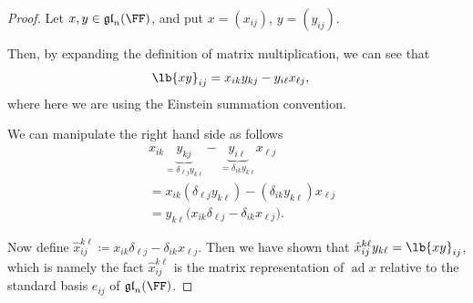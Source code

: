\documentclass{article}
\DeclarePairedDelimiter\lb\lbrack\rbrack
\DeclareMathOperator{\ad}{ad}
\newcommand*\gl{\ensuremath{\mathfrak{gl}}}
\begin{document}
\begin{proof}
    Let $x, y \in \gl_n(\FF)$, and put $x = (x_{ij})$, $y = (y_{ij})$.

    Then, by expanding the definition of matrix multiplication, we can see that
    \begin{align*}
        \lb{xy}_{ij}
        &=
        x_{ik}
        y_{kj}
        -
        y_{i\ell}x_{\ell j},
    \end{align*}
    where here we are using the Einstein summation convention.

    We can manipulate the right hand side as follows
    \begin{align*}
        &
        x_{ik}
        \underbrace{y_{kj}}_{=\delta_{\ell j}y_{k\ell}}
        -
        \underbrace{y_{i\ell}}_{=\delta_{ik}y_{k\ell}}
        x_{\ell j}
        \\
        &=
        x_{ik}
        (\delta_{\ell j}y_{k\ell})
        -
        (\delta_{ik}y_{k\ell})
        x_{\ell j}
        \\
        &=
        y_{k\ell}
        \Big(
            x_{ik}\delta_{\ell j}
            -
            \delta_{ik}x_{\ell j}
        \Big).
    \end{align*}

    Now define $\hat{x}_{ij}^{k\ell} \coloneq x_{ik}\delta_{\ell j} - \delta_{ik} x_{\ell j}$.
    Then we have shown that $\hat{x}_{ij}^{k\ell} y_{k\ell} = \lb{xy}_{ij}$, which is namely the fact $\hat{x}_{ij}^{k\ell}$ is the matrix representation of $\ad x$ relative to the standard basis $e_{ij}$ of $\gl_n(\FF)$.


\end{proof}
\end{document}

